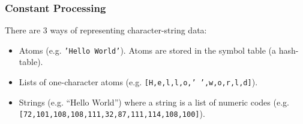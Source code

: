 \subsubsection{Constant Processing}

There are 3 ways of representing character-string data:

\begin{itemize}

\item Atoms (e.g. {\tt 'Hello World'}). Atoms are stored in the symbol
	table (a hash-table).

\item Lists of one-character atoms (e.g. {\tt [H,e,l,l,o,'~',w,o,r,l,d]}).

\item Strings (e.g. ``Hello World'') where a string is a list of
	numeric codes 
	(e.g. {\tt [72,101,108,108,111,32,87,111,114,108,100]}).

\end{itemize}


